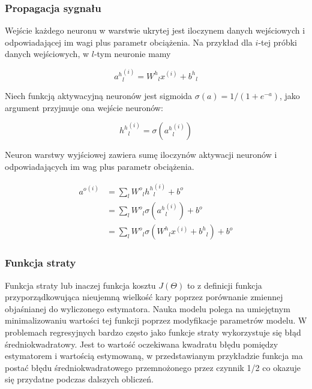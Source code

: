 \documentclass[11pt]{book}
\theoremstyle{definition}
\begin{document}
\subsubsection{Propagacja sygnału}

Wejście każdego neuronu w warstwie ukrytej jest iloczynem danych wejściowych i odpowiadającej im wagi plus parametr obciążenia. Na przykład dla $i$-tej próbki danych wejściowych, w $l$-tym neuronie mamy

\begin{equation}
{a^h}^{(i)}_l = {W^h}_{l}x^{(i)} + {b^h}_l
\end{equation}




Niech funkcją aktywacyjną neuronów jest sigmoida $\sigma(a) = 1 / ({1+e^{-a}})$, jako argument przyjmuje ona wejście neuronów:

\begin{equation}
{h^h}^{(i)}_l=\sigma({a^h}^{(i)}_l)
\end{equation}


Neuron warstwy wyjściowej zawiera sumę iloczynów aktywacji neuronów i odpowiadających im wag plus parametr obciążenia.

\begin{equation}
\begin{split}
{a^o}^{(i)} &= \sum_{l} {W^o}_l{h^h}^{(i)}_l + {b^o} \\
& = \sum_{l} {W^o}_l\sigma({a^h}^{(i)}_l) + {b^o} \\
& = \sum_{l} {W^o}_l\sigma({W^h}_{l}x^{(i)} + {b^h}_l) + {b^o}
\end{split}
\end{equation}

\subsubsection{Funkcja straty}

Funkcja straty lub inaczej funkcja kosztu $J(\Theta)$ to z definicji funkcja przyporządkowująca nieujemną wielkość kary poprzez porównanie zmiennej objaśnianej do wyliczonego estymatora. Nauka modelu polega na umiejętnym minimalizowaniu wartości tej funkcji poprzez modyfikacje parametrów modelu. W problemach regresyjnych bardzo często jako funkcje straty wykorzystuje się błąd średniokwadratowy. Jest to wartość oczekiwana kwadratu błędu pomiędzy estymatorem i wartością estymowaną, w przedstawianym przykładzie funkcja ma postać błędu średniokwadratowego przemnożonego przez czynnik 1/2 co okazuje się przydatne podczas dalszych obliczeń.
\end{document}
